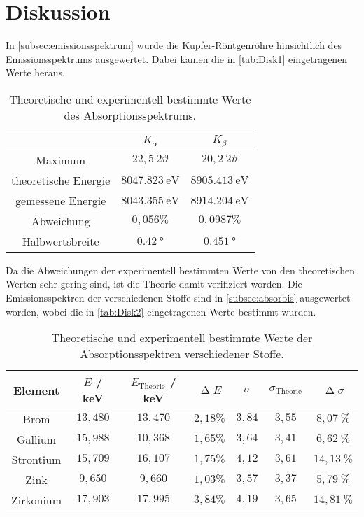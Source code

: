 \section{Diskussion}
\label{sec:Diskussion}
In \autoref{subsec:emissionsspektrum} wurde die Kupfer-Röntgenröhre hinsichtlich des Emissionsspektrums ausgewertet. Dabei kamen die in \autoref{tab:Disk1} eingetragenen Werte heraus.

\begin{table}[H]
    \caption{Theoretische und experimentell bestimmte Werte des Absorptionsspektrums.}
    \label{tab:Disk1}
    \centering
    \begin{tabular}{c c c}
        \toprule
         & $K_\alpha$ & $K_\beta$\\
        \midrule
        Maximum & $22,5 ~ 2\vartheta$ & $20,2 ~ 2\vartheta$ \\
        theoretische Energie & $\SI{8047,823}{\eV}$ & $\SI{8905,413}{\eV}$ \\
        gemessene Energie & $\SI{8043,355}{\eV}$ & $\SI{8914,204}{\eV}$ \\
        Abweichung & $0,056 \%$ & $0,0987 \%$ \\
        Halbwertsbreite & $\SI{0,42}{\degree}$ & $\SI{0,451}{\degree}$ \\
        \bottomrule
    \end{tabular}
\end{table}
Da die Abweichungen der experimentell bestimmten Werte von den theoretischen Werten \cite{NistXray, Abschirmkonstanten} sehr gering sind, ist die Theorie damit verifiziert worden.\newline
Die Emissionsspektren der verschiedenen Stoffe sind in \autoref{subsec:absorbis} ausgewertet worden, wobei die in \autoref{tab:Disk2} eingetragenen Werte bestimmt wurden.
\begin{table}[H]
    \caption{Theoretische und experimentell bestimmte Werte der Absorptionsspektren verschiedener Stoffe.}
    \centering
    \label{tab:Disk2}
    \begin{tabular}{c| c c c c c c}
        \toprule
        Element  & $E$ / keV & $E_{\text{Theorie}}$ / keV & $\upDelta E$ & $\sigma$ & $\sigma_{\text{Theorie}}$ & $\upDelta \sigma$ \\
        \midrule
        Brom      & $13,480$  & $13,470$  & $2,18 \%$ & $3,84$ & $3,55$ & $8,07  ~\%$ \\
        Gallium   & $15,988$  & $10,368$  & $1,65 \%$ & $3,64$ & $3,41$ & $6,62  ~\%$ \\
        Strontium & $15,709$  & $16,107$  & $1,75 \%$ & $4,12$ & $3,61$ & $14,13 ~\%$ \\
        Zink      & $9,650$   & $9,660$   & $1,03 \%$ & $3,57$ & $3,37$ & $5,79  ~\%$ \\
        Zirkonium & $17,903$  & $17,995$  & $3,84 \%$ & $4,19$ & $3,65$ & $14,81 ~\%$ \\
        \bottomrule
    \end{tabular}
\end{table}
